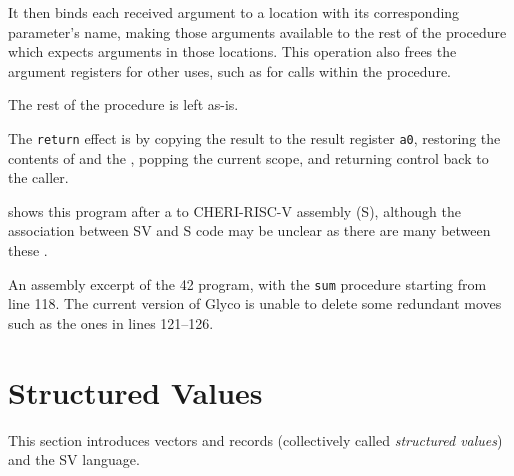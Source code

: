 \documentclass[main.tex]{subfiles}
\begin{document}
It then binds each received argument to a location with its corresponding parameter's name, making those arguments available to the rest of the procedure which expects arguments in those locations. This operation also frees the argument registers for other uses, such as for calls within the procedure.

The rest of the procedure is left as-is.

The \texttt{return} effect is \lowered{} by copying the result to the result register \texttt{a0}, restoring the contents of  and the , popping the current scope, and returning control back to the caller.

 shows this program after a  to CHERI-RISC-V assembly (S), although the association between SV and S code may be unclear as there are many  between these .

\begin{listing}[ht]
	\caption{An assembly excerpt of the 42 program, with the \texttt{sum} procedure starting from line 118. The current version of Glyco is unable to delete some redundant moves such as the ones in lines 121–126.}
	\label{lst:42s}
\end{listing}

\newpage

\section{Structured Values} \label{sct:sv}

This section introduces vectors and records (collectively called \emph{structured values}) and the SV language.
\end{document}
